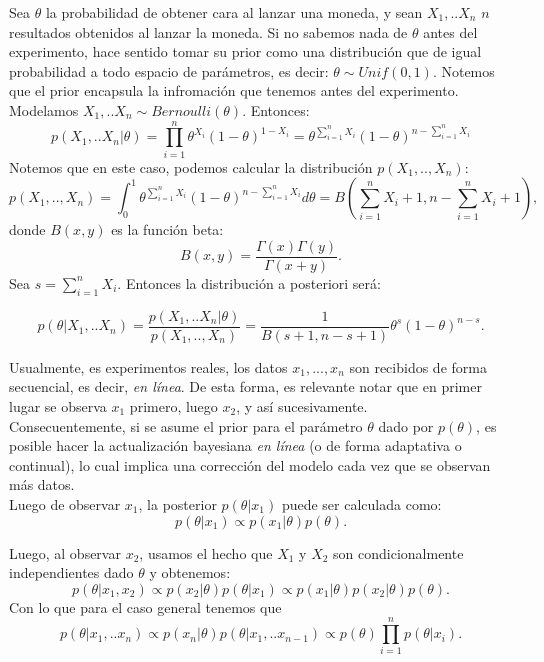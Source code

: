 \begin{example}
\label{ej_post_bernoulli_1}
Sea $\theta$ la probabilidad de obtener cara al lanzar una moneda, y sean $X_1,..X_n$ $n$ resultados obtenidos al lanzar la moneda. Si no sabemos nada de $\theta$ antes del experimento, hace sentido tomar su prior como una distribución que de igual probabilidad a todo espacio de parámetros, es decir: $\theta \sim Unif(0,1)$. Notemos que el prior encapsula la infromación que tenemos antes del experimento. Modelamos $X_1,..X_n \sim Bernoulli(\theta)$. Entonces: 
$$
p(X_1,..X_n|\theta)=\prod_{i=1}^{n} \theta^{X_i} (1-\theta)^{1-X_i} = 
\theta^{\sum_{i=1}^{n} X_i} (1-\theta)^{n-\sum_{i=1}^{n}X_i}
$$
Notemos que en este caso, podemos calcular la distribución $p(X_1,..,X_n)$:
$$
p(X_1,..,X_n)=\int_{0}^{1} \theta^{\sum_{i=1}^{n} X_i} (1-\theta)^{n-\sum_{i=1}^{n}X_i} d\theta = B\left(\sum_{i=1}^{n} X_i +1 , n- \sum_{i=1}^{n} X_i +1 \right),
$$
donde $B(x,y)$ es la función beta:
$$
B(x,y)=\dfrac{\Gamma(x)\Gamma(y)}{\Gamma(x+y)}.
$$
Sea $s= \sum_{i=1}^{n}X_i$. Entonces la distribución a posteriori será:

$$
p(\theta|X_1,..X_n)= \dfrac{p(X_1,..X_n|\theta)}{p(X_1,..,X_n)} = \dfrac{1}{B(s+1,n-s+1)} \theta^{s} (1-\theta)^{n-s}.
$$

\end{example} 

Usualmente, es experimentos reales, los datos  $x_1,...,x_n$ son recibidos de forma secuencial, es decir, \emph{en línea}. De esta forma, es relevante notar que en primer lugar se observa $x_1$ primero, luego $x_2$, y así sucesivamente. \\

Consecuentemente, si se asume el prior para el parámetro $\theta$ dado por $p(\theta)$, es posible hacer la actualización bayesiana \emph{en línea} (o de forma adaptativa o continual), lo cual implica una corrección del modelo cada vez que se observan más datos. \\
Luego de observar $x_1$, la posterior $p(\theta|x_1)$ puede ser calculada como: 
$$
p(\theta|x_1) \propto p(x_1|\theta) p(\theta).
$$

Luego, al observar $x_2$, usamos el hecho que $X_1$ y $X_2$ son condicionalmente independientes dado $\theta$ y obtenemos: 
$$
p(\theta | x_1,x_2) \propto 
p(x_2|\theta) p(\theta|x_1) \propto p(x_1 |\theta) p(x_2|\theta) p(\theta) . 
$$
Con lo que para el caso general tenemos que 
$$
p(\theta | x_1,..x_n) \propto p(x_n|\theta) p(\theta|x_1,..x_{n-1}) \propto p(\theta) \prod_{i=1}^n p(\theta | x_i).
$$

